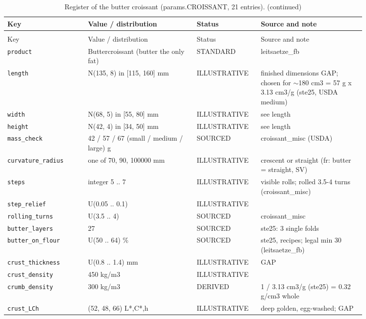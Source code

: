 \documentclass[10.5pt,a4paper]{article}
\begin{document}
{\scriptsize\begin{longtable}{@{}p{0.2\linewidth}p{0.27\linewidth}p{0.12\linewidth}p{0.26\linewidth}@{}}\caption{Register of the butter croissant (params.CROISSANT, 21 entries).}\\\toprule Key & Value / distribution & Status & Source and note \\\midrule\endfirsthead
\caption[]{Register of the butter croissant (params.CROISSANT, 21 entries). (continued)}\\\toprule Key & Value / distribution & Status & Source and note \\\midrule\endhead
\texttt{product} & Buttercroissant (butter the only fat) & STANDARD & leitsaetze\_fb \\
\texttt{length} & N(135, 8) in [115, 160] mm & ILLUSTRATIVE & finished dimensions GAP; chosen for $\sim$180 cm3 = 57 g x 3.13 cm3/g (ste25, USDA medium) \\
\texttt{width} & N(68, 5) in [55, 80] mm & ILLUSTRATIVE & see length \\
\texttt{height} & N(42, 4) in [34, 50] mm & ILLUSTRATIVE & see length \\
\texttt{mass\_\allowbreak{}check} & 42 / 57 / 67 (small / medium / large) g & SOURCED & croissant\_misc (USDA) \\
\texttt{curvature\_\allowbreak{}radius} & one of 70, 90, 100000 mm & ILLUSTRATIVE & crescent or straight (fr: butter = straight, SV) \\
\texttt{steps} & integer 5 .. 7 & ILLUSTRATIVE & visible rolls; rolled 3.5-4 turns (croissant\_misc) \\
\texttt{step\_\allowbreak{}relief} & U(0.05 .. 0.1) & ILLUSTRATIVE &  \\
\texttt{rolling\_\allowbreak{}turns} & U(3.5 .. 4) & SOURCED & croissant\_misc \\
\texttt{butter\_\allowbreak{}layers} & 27 & SOURCED & ste25: 3 single folds \\
\texttt{butter\_\allowbreak{}on\_\allowbreak{}flour} & U(50 .. 64) \% & SOURCED & ste25, recipes; legal min 30 (leitsaetze\_fb) \\
\texttt{crust\_\allowbreak{}thickness} & U(0.8 .. 1.4) mm & ILLUSTRATIVE & GAP \\
\texttt{crust\_\allowbreak{}density} & 450 kg/m3 & ILLUSTRATIVE &  \\
\texttt{crumb\_\allowbreak{}density} & 300 kg/m3 & DERIVED & 1 / 3.13 cm3/g (ste25) = 0.32 g/cm3 whole \\
\texttt{crust\_\allowbreak{}LCh} & (52, 48, 66) L*,C*,h & ILLUSTRATIVE & deep golden, egg-washed; GAP \\

\end{longtable}}
\end{document}
